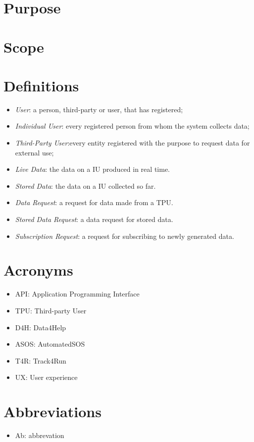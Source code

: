 \section{Purpose}
\section{Scope}
\section{Definitions}
\begin{itemize}
\item \textit{User}: a person, third-party or user, that has registered;
\item \textit{Individual User}: every registered person from whom the system collects data; 
\item \textit{Third-Party User}:every entity registered with the purpose to request data for external use;
\item \textit{Live Data}: the data on a IU produced in real time.
\item \textit{Stored Data}: the data on a IU collected so far.
\item \textit{Data Request}: a request for data made from a TPU.
\item \textit{Stored Data Request}: a data request for stored data.
\item \textit{Subscription Request}: a request for subscribing to newly generated data.
\end{itemize}
\section{Acronyms}
\begin{itemize}
\item API: Application Programming Interface
\item TPU: Third-party User
\item	D4H: Data4Help
\item	ASOS: AutomatedSOS
\item	T4R: Track4Run
\item UX: User experience
\end{itemize}

\section{Abbreviations}
\begin{itemize}
\item Ab: abbrevation
\end{itemize}

